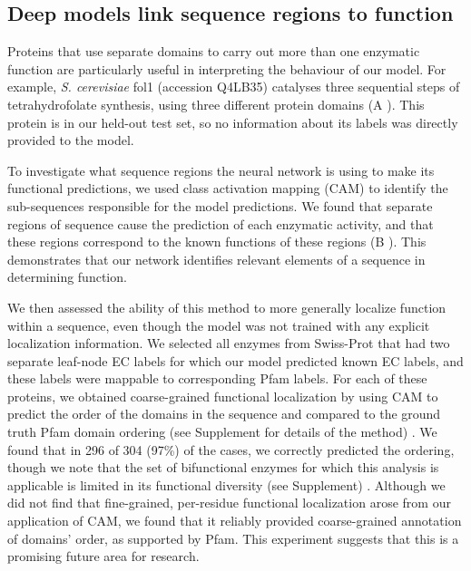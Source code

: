 \subsection*{Deep models link sequence regions to function}
Proteins that use separate domains to carry out more than one enzymatic function are particularly useful in interpreting the behaviour of our model. For example, \textit{S. cerevisiae} fol1 (accession Q4LB35) catalyses three sequential steps of tetrahydrofolate synthesis, using three different protein domains (A%
). This protein is in our held-out test set, so no information about its labels was directly provided to the model.

To investigate what sequence regions the neural network is using to make its functional predictions, we used class activation mapping (CAM) \citep{classactivationmapping} to identify the sub-sequences responsible for the model predictions. We found that separate regions of sequence cause the prediction of each enzymatic activity, and that these regions correspond to the known functions of these regions (B%
).  This demonstrates that our network identifies relevant elements of a sequence in determining function. 


We then assessed the ability of this method to more generally localize function within a sequence, even though the model was not trained with any explicit localization information. We selected all enzymes from Swiss-Prot that had two separate leaf-node EC labels for which our model predicted known EC labels, and these labels were mappable to corresponding Pfam labels. For each of these proteins, we obtained coarse-grained functional localization by using CAM to predict the order of the domains in the sequence and compared to the ground truth Pfam domain ordering (see Supplement for details of the method)%
. We found that in 296 of 304 (97\%) of the cases, we correctly predicted the ordering, though we note that the set of bifunctional enzymes for which this analysis is applicable is limited in its functional diversity (see Supplement)%
. Although we did not find that fine-grained, per-residue functional localization arose from our application of CAM, we found that it reliably provided coarse-grained annotation of domains' order, as supported by Pfam. This experiment suggests that this is a promising future area for research.
